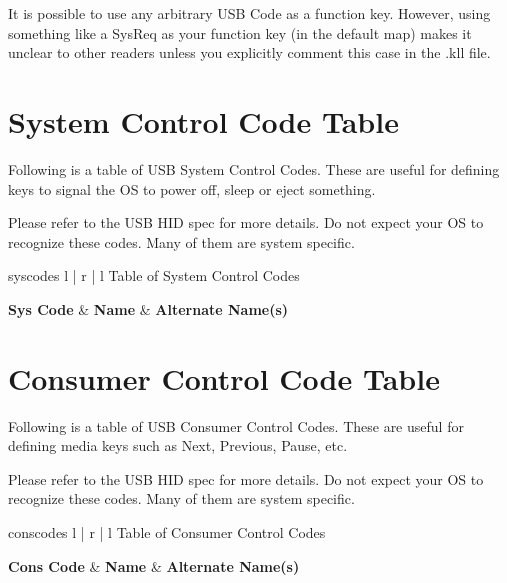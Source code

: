 \documentclass{kiibohd-template}
\begin{document}
It is possible to use any arbitrary USB Code as a function key.
However, using something like a SysReq as your function key (in the default map) makes it unclear to other readers unless you explicitly comment this case in the .kll file.


\newpage
\chapter{System Control Code Table}
\label{chpt:SysCodeTable}

Following is a table of USB System Control Codes.
These are useful for defining keys to signal the OS to power off, sleep or eject something.

Please refer to the USB HID spec for more details.
Do not expect your OS to recognize these codes.
Many of them are system specific.

\begin{ltable}{syscodes}{ l | r | l }{Table of System Control Codes}

\textbf{Sys Code} & \textbf{Name} & \textbf{Alternate Name(s)} \\
\hline
\hline


\end{ltable}


\newpage
\chapter{Consumer Control Code Table}
\label{chpt:ConsCodeTable}

Following is a table of USB Consumer Control Codes.
These are useful for defining media keys such as Next, Previous, Pause, etc.

Please refer to the USB HID spec for more details.
Do not expect your OS to recognize these codes.
Many of them are system specific.

\begin{ltable}{conscodes}{ l | r | l }{Table of Consumer Control Codes}

\textbf{Cons Code} & \textbf{Name} & \textbf{Alternate Name(s)} \\
\hline
\hline


\end{ltable}


\newpage
\end{document}
